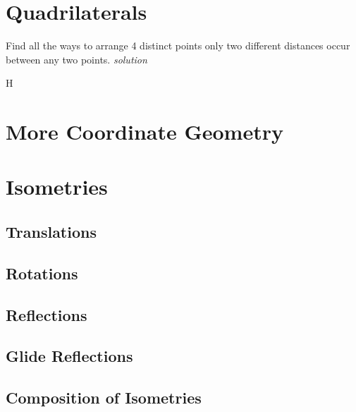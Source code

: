 \documentclass{amsbook}
\begin{document}
\chapter{Quadrilaterals}
\begin{Exercise}[title={Interesting Family of Quadrilaterals},difficulty=2 ,label=6a1 ]
	Find all the ways to arrange 4 distinct points only two different distances occur between any two points.
	\hfill \emph{solution} 
\end{Exercise}

\begin{Answer}[ref={6a1}]
	H
\end{Answer}


\chapter{More Coordinate Geometry}

\chapter{Isometries}

\section{Translations}

\section{Rotations}

\section{Reflections}

\section{Glide Reflections}

\section{Composition of Isometries}
\end{document}

